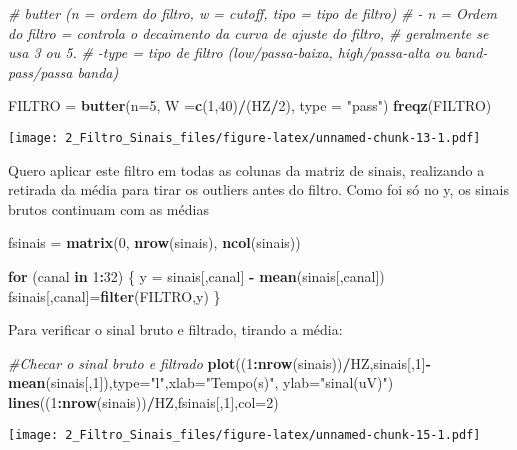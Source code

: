 \documentclass[]{article}
\newenvironment{Shaded}{\begin{snugshade}}{\end{snugshade}}
\newcommand{\KeywordTok}[1]{\textcolor[rgb]{0.13,0.29,0.53}{\textbf{#1}}}
\newcommand{\DataTypeTok}[1]{\textcolor[rgb]{0.13,0.29,0.53}{#1}}
\newcommand{\DecValTok}[1]{\textcolor[rgb]{0.00,0.00,0.81}{#1}}
\newcommand{\StringTok}[1]{\textcolor[rgb]{0.31,0.60,0.02}{#1}}
\newcommand{\CommentTok}[1]{\textcolor[rgb]{0.56,0.35,0.01}{\textit{#1}}}
\newcommand{\ControlFlowTok}[1]{\textcolor[rgb]{0.13,0.29,0.53}{\textbf{#1}}}
\newcommand{\OperatorTok}[1]{\textcolor[rgb]{0.81,0.36,0.00}{\textbf{#1}}}
\newcommand{\NormalTok}[1]{#1}
\begin{document}
\begin{Shaded}
\begin{Highlighting}[]
\CommentTok{# butter (n = ordem do filtro, w = cutoff, tipo = tipo de filtro)}
\CommentTok{#   - n = Ordem do filtro = controla o decaimento da curva de ajuste do filtro, #   geralmente se usa 3 ou 5.}
\CommentTok{#   -type = tipo de filtro (low/passa-baixa, high/passa-alta ou band-pass/passa banda)}

\NormalTok{FILTRO =}\StringTok{ }\KeywordTok{butter}\NormalTok{(}\DataTypeTok{n=}\DecValTok{5}\NormalTok{, }\DataTypeTok{W =}\KeywordTok{c}\NormalTok{(}\DecValTok{1}\NormalTok{,}\DecValTok{40}\NormalTok{)}\OperatorTok{/}\NormalTok{(HZ}\OperatorTok{/}\DecValTok{2}\NormalTok{), }\DataTypeTok{type =} \StringTok{"pass"}\NormalTok{)}
\KeywordTok{freqz}\NormalTok{(FILTRO)}
\end{Highlighting}
\end{Shaded}

\texttt{[image: 2\_Filtro\_Sinais\_files/figure-latex/unnamed-chunk-13-1.pdf]}

Quero aplicar este filtro em todas as colunas da matriz de sinais,
realizando a retirada da média para tirar os outliers antes do filtro.
Como foi só no y, os sinais brutos continuam com as médias

\begin{Shaded}
\begin{Highlighting}[]
\NormalTok{fsinais =}\StringTok{ }\KeywordTok{matrix}\NormalTok{(}\DecValTok{0}\NormalTok{, }\KeywordTok{nrow}\NormalTok{(sinais), }\KeywordTok{ncol}\NormalTok{(sinais))}

\ControlFlowTok{for}\NormalTok{ (canal }\ControlFlowTok{in} \DecValTok{1}\OperatorTok{:}\DecValTok{32}\NormalTok{) \{}
\NormalTok{  y =}\StringTok{ }\NormalTok{sinais[,canal] }\OperatorTok{-}\StringTok{ }\KeywordTok{mean}\NormalTok{(sinais[,canal])}
\NormalTok{  fsinais[,canal]=}\KeywordTok{filter}\NormalTok{(FILTRO,y)}
\NormalTok{\}}
\end{Highlighting}
\end{Shaded}

Para verificar o sinal bruto e filtrado, tirando a média:

\begin{Shaded}
\begin{Highlighting}[]
\CommentTok{#Checar o sinal bruto e filtrado}
\KeywordTok{plot}\NormalTok{((}\DecValTok{1}\OperatorTok{:}\KeywordTok{nrow}\NormalTok{(sinais))}\OperatorTok{/}\NormalTok{HZ,sinais[,}\DecValTok{1}\NormalTok{]}\OperatorTok{-}\KeywordTok{mean}\NormalTok{(sinais[,}\DecValTok{1}\NormalTok{]),}\DataTypeTok{type=}\StringTok{"l"}\NormalTok{,}\DataTypeTok{xlab=}\StringTok{"Tempo(s)"}\NormalTok{, }\DataTypeTok{ylab=}\StringTok{"sinal(uV)"}\NormalTok{)}
\KeywordTok{lines}\NormalTok{((}\DecValTok{1}\OperatorTok{:}\KeywordTok{nrow}\NormalTok{(sinais))}\OperatorTok{/}\NormalTok{HZ,fsinais[,}\DecValTok{1}\NormalTok{],}\DataTypeTok{col=}\DecValTok{2}\NormalTok{)}
\end{Highlighting}
\end{Shaded}

\texttt{[image: 2\_Filtro\_Sinais\_files/figure-latex/unnamed-chunk-15-1.pdf]}
\end{document}
